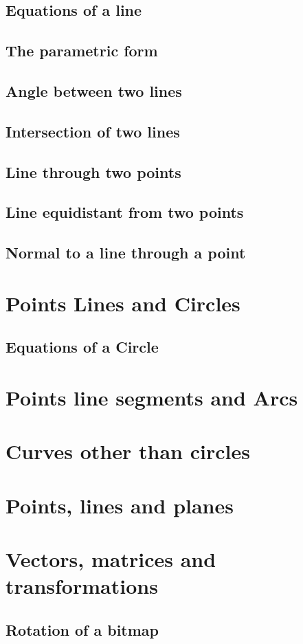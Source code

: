 \documentclass[12pt,a4,oneside,usenames,dvipsnames]{book}
\newcommand\bitmap{{\pixel{}bitmap}}
\begin{document}
\chapter{Equations of a line}
\chapter{The parametric form}
\chapter{Angle between two lines}
\chapter{Intersection of two lines}
\chapter{Line through two points}
\chapter{Line equidistant from two points}
\chapter{Normal to a line through a point}
\part{Points Lines and Circles}
\chapter{Equations of a Circle}
\part{Points line segments and Arcs}
\part{Curves other than circles}
\part{Points, lines and planes}
\part{Vectors, matrices and transformations}
\chapter{Rotation of a \bitmap{}}
\end{document}
